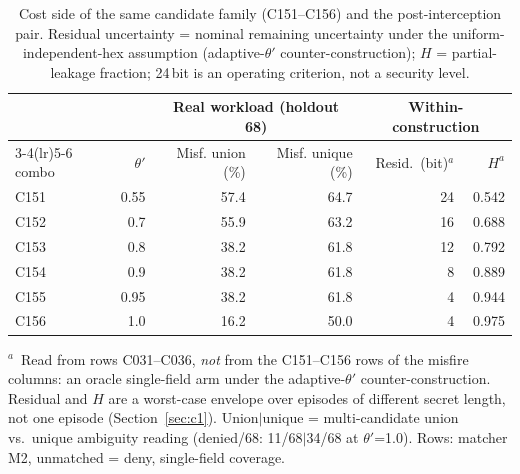 \begin{table}[!htbp]
\centering
\caption{Cost side of the same candidate family (C151--C156) and the post-interception pair. Residual uncertainty = nominal remaining uncertainty under the uniform-independent-hex assumption (adaptive-$\theta'$ counter-construction); $H$ = partial-leakage fraction; 24\,bit is an operating criterion, not a security level.}
\label{tab:mainb}
\small
\begin{tabular}{lrrrrr}
\toprule
 & & \multicolumn{2}{c}{Real workload (holdout 68)} & \multicolumn{2}{c}{Within-construction} \\
\cmidrule(lr){3-4}\cmidrule(lr){5-6}
combo & $\theta'$ & Misf. union (\%) & Misf. unique (\%) & Resid.\ (bit)$^{a}$ & $H^{a}$ \\
\midrule
C151 & 0.55 & 57.4 & 64.7 & 24 & 0.542 \\
C152 & 0.7 & 55.9 & 63.2 & 16 & 0.688 \\
C153 & 0.8 & 38.2 & 61.8 & 12 & 0.792 \\
C154 & 0.9 & 38.2 & 61.8 & 8 & 0.889 \\
C155 & 0.95 & 38.2 & 61.8 & 4 & 0.944 \\
C156 & 1.0 & 16.2 & 50.0 & 4 & 0.975 \\
\bottomrule
\end{tabular}
\par\smallskip
{\footnotesize\begin{minipage}{0.98\linewidth}
\footnotesize $^{a}$~Read from rows C031--C036, \emph{not} from the C151--C156 rows of the misfire columns: an oracle single-field arm under the adaptive-$\theta'$ counter-construction. Residual and $H$ are a worst-case envelope over episodes of different secret length, not one episode (Section~\ref{sec:c1}). Union$|$unique = multi-candidate union vs.\ unique ambiguity reading (denied/68: 11/68$|$34/68 at $\theta'$=1.0). Rows: matcher M2, unmatched = deny, single-field coverage.
\end{minipage}}
\end{table}
